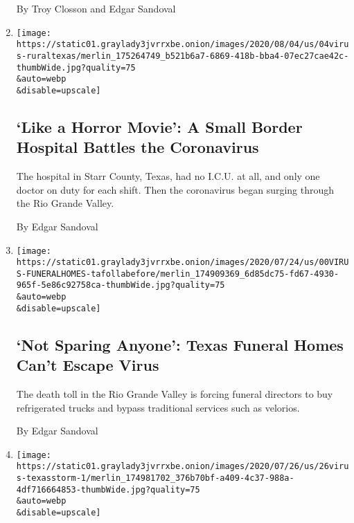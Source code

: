\begin{enumerate}
  By Troy Closson and Edgar Sandoval
\item
  \href{/2020/08/04/us/texas-coronavirus-rio-grande-valley-starr-county.html}{}

  \texttt{[image: https://static01.graylady3jvrrxbe.onion/images/2020/08/04/us/04virus-ruraltexas/merlin\_175264749\_b521b6a7-6869-418b-bba4-07ec27cae42c-thumbWide.jpg?quality=75\\\&auto=webp\\\&disable=upscale]}

  \hypertarget{like-a-horror-movie-a-small-border-hospital-battles-the-coronavirus}{%
  \subsection{`Like a Horror Movie': A Small Border Hospital Battles the
  Coronavirus}\label{like-a-horror-movie-a-small-border-hospital-battles-the-coronavirus}}

  The hospital in Starr County, Texas, had no I.C.U. at all, and only
  one doctor on duty for each shift. Then the coronavirus began surging
  through the Rio Grande Valley.

  By Edgar Sandoval
\item
  \href{/2020/07/28/us/coronavirus-texas-funeral-homes.html}{}

  \texttt{[image: https://static01.graylady3jvrrxbe.onion/images/2020/07/24/us/00VIRUS-FUNERALHOMES-tafollabefore/merlin\_174909369\_6d85dc75-fd67-4930-965f-5e86c92758ca-thumbWide.jpg?quality=75\\\&auto=webp\\\&disable=upscale]}

  \hypertarget{not-sparing-anyone-texas-funeral-homes-cant-escape-virus}{%
  \subsection{`Not Sparing Anyone': Texas Funeral Homes Can't Escape
  Virus}\label{not-sparing-anyone-texas-funeral-homes-cant-escape-virus}}

  The death toll in the Rio Grande Valley is forcing funeral directors
  to buy refrigerated trucks and bypass traditional services such as
  velorios.

  By Edgar Sandoval
\item
  \href{/2020/07/26/us/virus-texas-storm.html}{}

  \texttt{[image: https://static01.graylady3jvrrxbe.onion/images/2020/07/26/us/26virus-texasstorm-1/merlin\_174981702\_376b70bf-a409-4c37-988a-4df716664853-thumbWide.jpg?quality=75\\\&auto=webp\\\&disable=upscale]}

  \hypertarget{hurricanes-choice-for-texans-shelter-from-the-virus-or-the-storm}{%
}
\end{enumerate}
